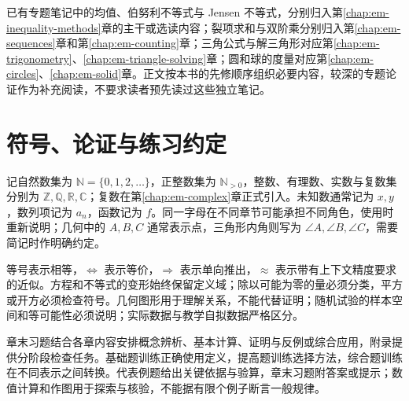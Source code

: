 已有专题笔记中的均值、伯努利不等式与 Jensen 不等式，分别归入第\ref{chap:em-inequality-methods}章的主干或选读内容；裂项求和与双阶乘分别归入第\ref{chap:em-sequences}章和第\ref{chap:em-counting}章；三角公式与解三角形对应第\ref{chap:em-trigonometry}、\ref{chap:em-triangle-solving}章；圆和球的度量对应第\ref{chap:em-circles}、\ref{chap:em-solid}章。正文按本书的先修顺序组织必要内容，较深的专题论证作为补充阅读，不要求读者预先读过这些独立笔记。

\section*{符号、论证与练习约定}
记自然数集为 $\mathbb N=\{0,1,2,\ldots\}$，正整数集为 $\mathbb N_{>0}$，整数、有理数、实数与复数集分别为 $\mathbb Z,\mathbb Q,\mathbb R,\mathbb C$；复数在第\ref{chap:em-complex}章正式引入。未知数通常记为 $x,y$，数列项记为 $a_n$，函数记为 $f$。同一字母在不同章节可能承担不同角色，使用时重新说明；几何中的 $A,B,C$ 通常表示点，三角形内角则写为 $\angle A,\angle B,\angle C$，需要简记时作明确约定。

等号表示相等，$\Longleftrightarrow$ 表示等价，$\Longrightarrow$ 表示单向推出，$\approx$ 表示带有上下文精度要求的近似。方程和不等式的变形始终保留定义域；除以可能为零的量必须分类，平方或开方必须检查符号。几何图形用于理解关系，不能代替证明；随机试验的样本空间和等可能性必须说明；实际数据与教学自拟数据严格区分。

章末习题结合各章内容安排概念辨析、基本计算、证明与反例或综合应用，附录提供分阶段检查任务。基础题训练正确使用定义，提高题训练选择方法，综合题训练在不同表示之间转换。代表例题给出关键依据与验算，章末习题附答案或提示；数值计算和作图用于探索与核验，不能据有限个例子断言一般规律。

